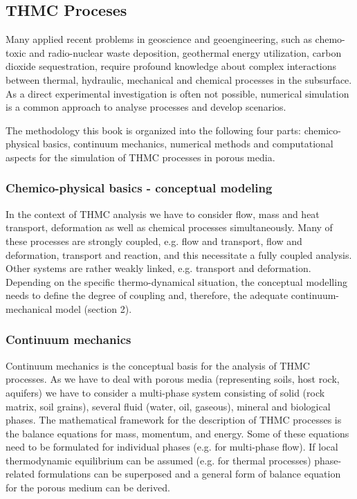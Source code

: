 \subsection*{THMC Proceses}

Many applied recent problems in geoscience and geoengineering, such as chemo-toxic and radio-nuclear waste deposition, geothermal energy utilization, carbon dioxide sequestration, require profound knowledge about complex interactions between thermal, hydraulic, mechanical and chemical processes in the subsurface. As a direct experimental investigation is often not possible, numerical simulation is a common approach to analyse processes and develop scenarios.

The methodology this book is organized into the following four parts: chemico-physical basics, continuum mechanics, numerical methods and computational aspects for the simulation of THMC processes in porous media.

\subsubsection*{Chemico-physical basics - conceptual modeling}
In the context of THMC analysis we have to consider flow, mass and heat transport, deformation as well as chemical processes simultaneously. Many of these processes are strongly coupled, e.g. flow and transport, flow and deformation, transport and reaction, and this necessitate a fully coupled analysis. Other systems are rather weakly linked, e.g. transport and deformation. Depending on the specific thermo-dynamical situation, the conceptual modelling needs to define the degree of coupling and, therefore, the adequate continuum-mechanical model (section 2).

\subsubsection*{Continuum mechanics}
Continuum mechanics is the conceptual basis for the analysis of THMC processes. As we have to deal with porous media (representing soils, host rock, aquifers) we have to consider a multi-phase system consisting of solid (rock matrix, soil grains), several fluid (water, oil, gaseous), mineral and biological phases. The mathematical framework for the description of THMC processes is the balance equations for mass, momentum, and energy. Some of these equations need to be formulated for individual phases (e.g. for multi-phase flow). If local thermodynamic equilibrium can be assumed (e.g. for thermal processes) phase-related formulations can be superposed and a general form of balance equation for the porous medium can be derived.

